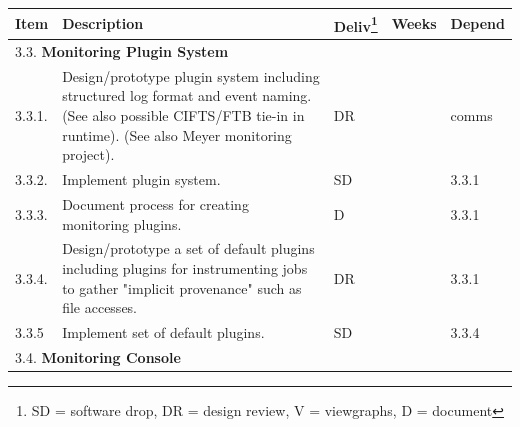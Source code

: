 \begin{longtable}{|p{1cm}|p{10.2cm}|p{1cm}|p{1cm}|p{1.8cm}|}\hline
  \textbf{Item} & \textbf{Description}
                & \textbf{Deliv}\footnote{SD = software drop,
                        DR = design review, V = viewgraphs, D = document}
                & \textbf{Weeks} & \textbf{Depend} \\
  \hline
  \hline
  \multicolumn{5}{|l|}{3.3. \textbf{Monitoring Plugin System}} \\
  \hline
  3.3.1.& Design/prototype plugin system including structured log format
	  and event naming.  (See also possible CIFTS/FTB tie-in in runtime).
          (See also Meyer monitoring project).
	& DR
	&
	& comms \\
  \hline
  3.3.2.& Implement plugin system.
        & SD
        &
        & 3.3.1 \\
  \hline
  3.3.3.& Document process for creating monitoring plugins.
        & D
        &
        & 3.3.1 \\
  \hline
  3.3.4.& Design/prototype a set of default plugins including plugins
          for instrumenting jobs to gather "implicit provenance" such as
          file accesses.
        & DR
        & 
        & 3.3.1 \\
  \hline
  3.3.5 & Implement set of default plugins.
        & SD
        &
        & 3.3.4 \\

  \hline
  \multicolumn{5}{|l|}{3.4. \textbf{Monitoring Console}} \\
  \hline


\end{longtable}
